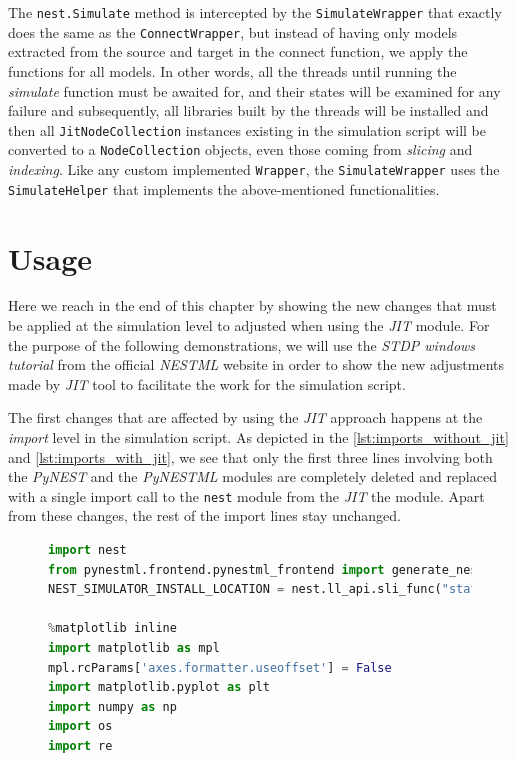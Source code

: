 The \texttt{nest.Simulate} method is intercepted by the \texttt{SimulateWrapper} that exactly does the same as the \texttt{ConnectWrapper}, but instead of having only models extracted from the source and target in the connect function, we apply the functions for all models. In other words, all the threads until running the \emph{simulate} function must be awaited for, and their states will be examined for any failure and subsequently, all libraries built by the threads will be installed and then all \texttt{JitNodeCollection} instances existing in the simulation script will be converted to a \texttt{NodeCollection} objects, even those coming from \emph{slicing} and \emph{indexing}. Like any custom implemented \texttt{Wrapper}, the \texttt{SimulateWrapper} uses the \texttt{SimulateHelper} that implements the above-mentioned functionalities.






\section{Usage}

Here we reach in the end of this chapter by showing the new changes that must be applied at the simulation level to adjusted when using the \emph{JIT} module.
For the purpose of the following demonstrations, we will use the \emph{STDP windows tutorial} from the official \emph{NESTML} website in order to show the new adjustments made by \emph{JIT} tool to facilitate the work for the simulation script.

 

The first changes that are affected by using  the \emph{JIT} approach happens at the \emph{import} level in the simulation script. As depicted in the \autoref{lst:imports_without_jit} and \autoref{lst:imports_with_jit}, we see that only the first three lines involving both the \emph{PyNEST} and the \emph{PyNESTML} modules are completely deleted and replaced with a single import call to the \texttt{nest} module from the \emph{JIT} the module. Apart from these changes, the rest of the import lines stay unchanged. 

\begin{figure}[ht!]
\centering
\begin{lstlisting}[language=Python, label=lst:imports_without_jit, caption={The Simulation script imports without JIT}]
import nest
from pynestml.frontend.pynestml_frontend import generate_nest_target
NEST_SIMULATOR_INSTALL_LOCATION = nest.ll_api.sli_func("statusdict/prefix ::")

%matplotlib inline
import matplotlib as mpl
mpl.rcParams['axes.formatter.useoffset'] = False
import matplotlib.pyplot as plt
import numpy as np
import os
import re

\end{lstlisting}
\end{figure}

